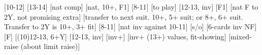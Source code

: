 \begin{bidsemi}
[10-12]
[13-14]
[nat comp]
[nat, 10+, F1]
    [8-11]
        [to play]
    [12-13, inv]
    [F1]
    [nat F to 2Y, not promising extra]
[transfer to next suit. 10+, 5+ suit; or 8+, 6+ suit. Transfer to 2Y is 10+, 3+ fit]
    [8-11]
        [nat inv against 10-11]
        [s/o]
        [6-cards inv NF]
        [F]
    [(10)12-13, 6+Y]
    [12-13, inv]
    [inv+]
[inv+ (13+) values, fit-showing]
[mixed-raise (about limit raise)]
\end{bidsemi}